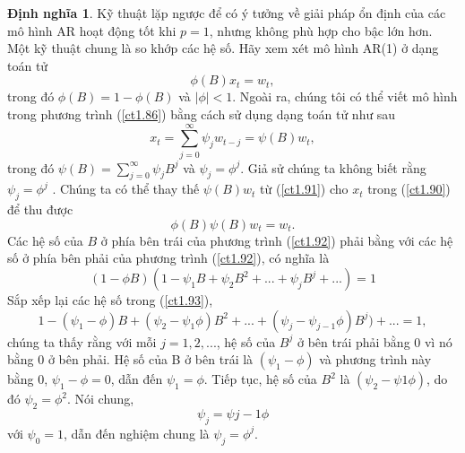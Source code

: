 \documentclass[12pt, a4paper,oneside]{book}
\theoremstyle{definition}
\newtheorem{dn}[theo]{Định nghĩa}
\begin{document}
\begin{dn}
Kỹ thuật lặp ngược để có ý tưởng về giải pháp ổn định của các mô hình AR hoạt động tốt khi $p = 1$, nhưng không phù hợp cho bậc lớn hơn. Một kỹ thuật chung là so khớp các hệ số. Hãy xem xét mô hình AR(1) ở dạng toán tử 
	\begin{equation}
	\phi(B)x_{t}= w_{t}, \label{ct1.90}	
	\end{equation}
trong đó $\phi(B) = 1- \phi(B)$ và $|\phi| <1$. Ngoài ra, chúng tôi có thể viết mô hình trong phương trình (\ref{ct1.86}) bằng cách sử dụng dạng toán tử như sau
\begin{equation}
x_{t}= \sum_{j=0}^{\infty}\psi_{j}w_{t-j} = \psi(B)w_{t}, \label{ct1.91}
\end{equation}
trong đó $\psi(B)= \sum_{j=0}^{\infty}\psi_{j}B^{j}$ và $\psi_{j} = \phi^{j}$. Giả sử chúng ta không biết rằng $\psi_{j} = \phi^{j}$ . Chúng ta có thể thay thế $\psi(B)w_{t}$ từ (\ref{ct1.91}) cho $x_{t}$ trong (\ref{ct1.90}) để thu được 
\begin{equation}
\phi(B)\psi(B)w_{t} = w_{t}. \label{ct1.92}
\end{equation}
Các hệ số của $B$ ở phía bên trái của phương trình (\ref{ct1.92}) phải bằng với các hệ số ở phía bên phải của phương trình (\ref{ct1.92}), có nghĩa là 
\begin{equation}
(1- \phi B)(1-\psi_{1}B +\psi_{2}B^{2}+...+\psi_{j}B^{j}+...)=1 \label{ct1.93}
\end{equation}	
Sắp xếp lại các hệ số trong (\ref{ct1.93}),
\begin{equation}
1- (\psi_{1} -\phi)B + (\psi_{2}-\psi_{1}\phi)B^{2}+...+ (\psi_{j}-\psi_{j-1}\phi)B^{j})+...=1, \label{ct1.94}
\end{equation}	
chúng ta thấy rằng với mỗi $j = 1, 2, ...$, hệ số của $B^{j}$ ở bên trái phải bằng 0 vì nó bằng 0 ở bên phải. Hệ số của B ở bên trái là $(\psi_{1}-\phi)$ và phương trình này bằng 0, $\psi_{1} −\phi = 0$, dẫn đến $\psi_{1} = \phi$. Tiếp tục, hệ số của $B^{2}$ là $(\psi_{2}-\psi{1}\phi)$, do đó $\psi_{2}= \phi^{2}$. Nói chung,
\begin{equation}
	\psi_{j}= \psi{j-1}\phi \label{ct1.95}
\end{equation}	
với $\psi_{0} = 1$, dẫn đến nghiệm chung là $\psi_{j} = \phi^{j}$.


\end{dn}
\end{document}
